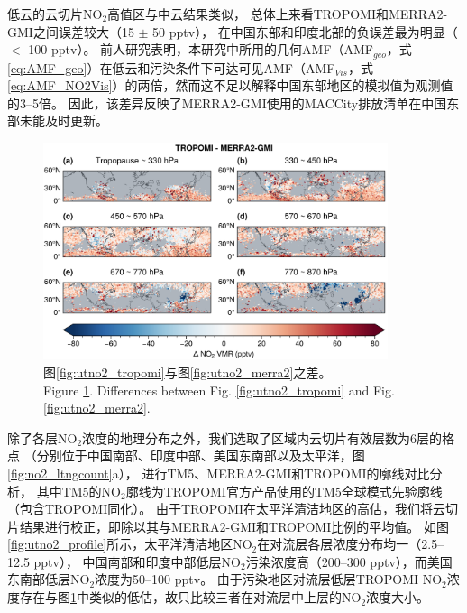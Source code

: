 低云的云切片NO$_2$高值区与中云结果类似，
总体上来看TROPOMI和MERRA2-GMI之间误差较大（15 $\pm$ 50 pptv），
在中国东部和印度北部的负误差最为明显（$<$-100 pptv）。
前人研究表明，本研究中所用的几何AMF（AMF$_{geo}$，式\ref{eq:AMF_geo}）在低云和污染条件下可达可见AMF（AMF$_{Vis}$，式\ref{eq:AMF_NO2Vis}）的两倍\citep{BelmonteRivas.2015}，然而这不足以解释中国东部地区的模拟值为观测值的3--5倍。
因此，该差异反映了MERRA2-GMI使用的MACCity排放清单在中国东部未能及时更新。


\begin{figure}[H]
    \centering
    \includegraphics[width=0.9\textwidth]{./figures/utno2_delta.png}
    \caption{
    图\ref{fig:utno2_tropomi}与图\ref{fig:utno2_merra2}之差。 \\
    Figure \ref{fig:utno2_delta}. Differences between Fig. \ref{fig:utno2_tropomi} and Fig. \ref{fig:utno2_merra2}.
    }
    \label{fig:utno2_delta}
\end{figure}



除了各层NO$_2$浓度的地理分布之外，我们选取了区域内云切片有效层数为6层的格点
（分别位于中国南部、印度中部、美国东南部以及太平洋，图\ref{fig:no2_ltngcount}a），
进行TM5、MERRA2-GMI和TROPOMI的廓线对比分析，
其中TM5的NO$_2$廓线为TROPOMI官方产品使用的TM5全球模式先验廓线（包含TROPOMI同化）。
由于TROPOMI在太平洋清洁地区的高估，我们将云切片结果进行校正，即除以其与MERRA2-GMI和TROPOMI比例的平均值。
如图\ref{fig:utno2_profile}所示，太平洋清洁地区NO$_2$在对流层各层浓度分布均一（2.5--12.5 pptv），
中国南部和印度中部低层NO$_2$污染浓度高（200--300 pptv），而美国东南部低层NO$_2$浓度为50--100 pptv。
由于污染地区对流层低层TROPOMI NO$_2$浓度存在与图\ref{fig:utno2_delta}中类似的低估，故只比较三者在对流层中上层的NO$_2$浓度大小。


